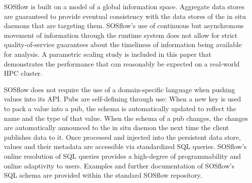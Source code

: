 %
SOSflow is built on a model of a global information space.
%
Aggregate data stores are guaranteed to provide eventual consistency with
the data stores of the in situ daemons that are targeting them.
%
SOSflow's use of continuous but asynchronous movement of information through
the runtime system does not allow for strict quality-of-service guarantees
about the timeliness of information being available for analysis.
%
A parametric scaling study is included in this paper that demonstrates the
performance that can reasonably be expected on a real-world HPC cluster.
%
%
\par
%
SOSflow does not require the use of a domain-specific language when
pushing values into its API.
%
Pubs are self-defining through use: When a new key is used to pack a value
into a pub, the schema is automatically updated to reflect the name and the
type of that value.
%
When the schema of a pub changes, the changes are automatically announced
to the in situ daemon the next time the client publishes data to it.
%
Once processed and injected into the persistent data store, values and their
metadata are accessible via standardized SQL queries.
%
SOSflow's online resolution of SQL queries provides a high-degree of
programmability and online adaptivity to users.
%
Examples and further documentation of SOSflow's SQL schema are provided
within the standard SOSflow repository.
%
%
